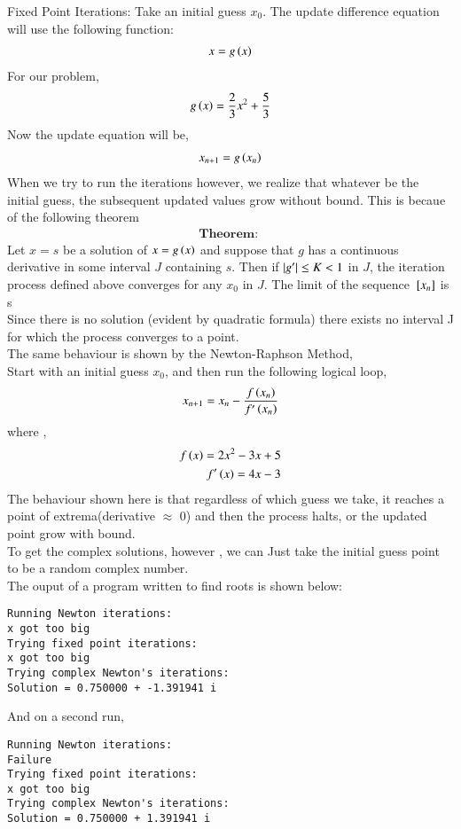 \documentclass[journal]{IEEEtran}
\begin{document}
Fixed Point Iterations:
Take an initial guess $x_0$. The update difference equation will use the following function:
\begin{align}
    x = g\left(x\right)
\end{align}
For our problem,
\begin{align}
    g\left(x\right) = \frac{2}{3}x^2 + \frac{5}{3}
\end{align}
Now the update equation will be,
\begin{align}
    x_{n+1} = g\left(x_n\right) 
\end{align}
When we try to run the iterations however, we realize that whatever be the initial guess, 
the subsequent updated values grow without bound. This is becaue of the following theorem\\
\begin{align}
    \textbf{Theorem: }
\end{align}
    Let $x = s$ be a solution of $x = g\left(x\right)$ and suppose that $g$ has a continuous
    derivative in some interval $J$ containing $s$. Then if $\left\vert g^{\prime}\right\vert \le K < 1$ in $J$,
    the iteration process defined  above converges for any $x_0$ in $J$. The limit of the sequence
    ${}\left[x_n\right]$ is s\\
\newline
Since there is no solution (evident by quadratic formula) there exists no interval J for which
the process converges to a point.\\
\newline
The same behaviour is shown by the Newton-Raphson Method,\\
Start with an initial guess $x_0$, and then run the following logical loop,
\begin{align}
    x_{n+1} = x_n - \frac{f\left(x_n\right)}{f^{\prime}\left(x_n\right)} 
\end{align}
where ,
\begin{align}
    f\left(x\right) = 2x^2 - 3x + 5\\
    f^{\prime}\left(x\right) = 4x-3
\end{align}
\newline
The behaviour shown here is that regardless of which guess we take, it reaches a point of 
extrema(derivative $\approx$ 0) and then the process halts, or the updated point grow with bound.\\
To get the complex solutions, however , we can Just take the initial guess point to be a 
random complex number.\\
The ouput of a program written to find roots is shown below:
\begin{verbatim}
Running Newton iterations:
x got too big
Trying fixed point iterations:
x got too big
Trying complex Newton's iterations:
Solution = 0.750000 + -1.391941 i
\end{verbatim}
And on a second run, 
\begin{verbatim}
Running Newton iterations:
Failure
Trying fixed point iterations:
x got too big
Trying complex Newton's iterations:
Solution = 0.750000 + 1.391941 i
\end{verbatim}
\end{document}

